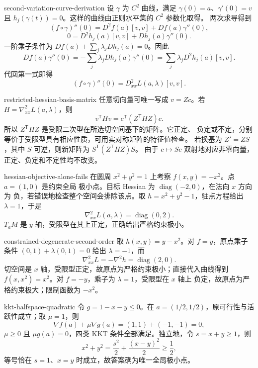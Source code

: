 \begin{solution}{second-variation-curve-derivation}
设 \(\gamma\) 为 \(C^2\) 曲线，满足 $\gamma(0)=a$、$\gamma'(0)=v$
且 $h_j(\gamma(t))=0$。这样的曲线由正则水平集的 \(C^2\) 参数化取得。
两次求导得到
\[
 (f\circ\gamma)''(0)=D^2f(a)[v,v]+Df(a)\gamma''(0),
\]
\[
 0=D^2h_j(a)[v,v]+Dh_j(a)\gamma''(0).
\]
一阶乘子条件为
$Df(a)+\sum_j\lambda_jDh_j(a)=0$。因此
\[
 Df(a)\gamma''(0)
 =-\sum_j\lambda_jDh_j(a)\gamma''(0)
 =\sum_j\lambda_jD^2h_j(a)[v,v].
\]
代回第一式即得
\[
 (f\circ\gamma)''(0)
 =D^2_{xx}L(a,\lambda)[v,v].
\]
\end{solution}

\begin{solution}{restricted-hessian-basis-matrix}
任意切向量可唯一写成 $v=Zc$。若 $H=\nabla^2_{xx}L(a,\lambda)$，则
\[
 v^{\mathsf T}Hv=c^{\mathsf T}(Z^{\mathsf T}HZ)c.
\]
所以 $Z^{\mathsf T}HZ$ 是受限二次型在所选切空间基下的矩阵。它正定、
负定或不定，分别等价于受限型具有相应性质，可用实对称矩阵的特征值检查。
若换基为 \(Z'=ZS\)，其中 \(S\) 可逆，则新矩阵为
\(S^{\mathsf T}(Z^{\mathsf T}HZ)S\)。
由于 \(c\mapsto Sc\) 双射地对应非零向量，正定、负定和不定性均不改变。
\end{solution}

\begin{solution}{hessian-objective-alone-fails}
在圆周 $x^2+y^2=1$ 上考察 $f(x,y)=-x^2$。点 $a=(1,0)$ 是约束全局
极小点。目标 Hessian 为 $\operatorname{diag}(-2,0)$，在法向 $x$ 方向为
负，若错误地检查整个空间会排除该点。取 $h=x^2+y^2-1$，驻点方程给出
$\lambda=1$，于是
\[
 \nabla^2_{xx}L(a,\lambda)=\operatorname{diag}(0,2).
\]
$T_aM$ 是 $y$ 轴，受限型在其上正定，正确给出严格约束极小。
\end{solution}

\begin{solution}{constrained-degenerate-second-order}
取 $h(x,y)=y-x^2$。对 $f=y$，原点乘子条件
$(0,1)+\lambda(0,1)=0$ 给出 $\lambda=-1$，而
\[
 \nabla^2_{xx}L=-\nabla^2h=\operatorname{diag}(2,0).
\]
切空间是 $x$ 轴，受限型正定，故原点为严格约束极小；直接代入曲线得到
$f(x,x^2)=x^2$。对 $f=-y$，乘子为 $\lambda=1$，受限型在 $x$ 轴上
负定，故原点为严格约束极大；限制函数为 $-x^2$。
\end{solution}

\begin{solution}{kkt-halfspace-quadratic}
令 $g=1-x-y\le0$。在 $a=(1/2,1/2)$，原可行性与活跃性成立；取
$\mu=1$，则
\[
 \nabla f(a)+\mu\nabla g(a)=(1,1)+(-1,-1)=0,
\]
$\mu\ge0$ 且 $\mu g(a)=0$，四类 KKT 条件全部满足。独立地，令
$s=x+y\ge1$，则
\[
 x^2+y^2=\frac{s^2}{2}+\frac{(x-y)^2}{2}\ge\frac12,
\]
等号恰在 $s=1$、$x=y$ 时成立，故答案确为唯一全局极小点。
\end{solution}

